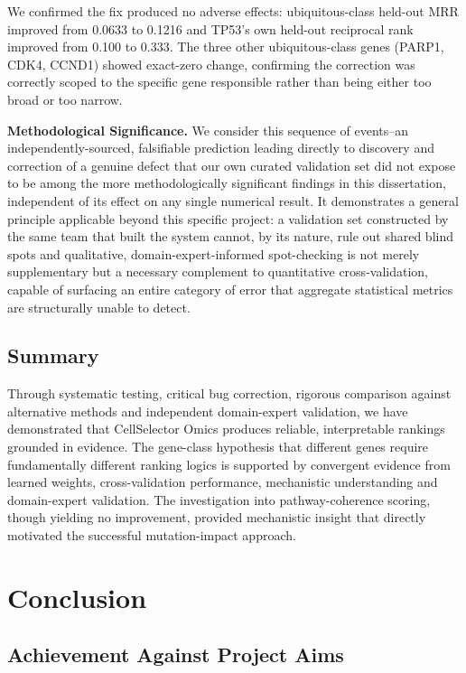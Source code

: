 \documentclass[author={Karen Coutinho, Ishaan Bhalla, Aman Raj, Dixit Kaloorani Malarmannan},
                supervisor={Dr. Daniel D'Andrea},
                degree={MSc},
                title={CellSelector Omics: A Multi-Omics Recommendation System for Cell Line Selection},
                subtitle={},
                type={},
                year={2026}]{dissertation}
\begin{document}
We confirmed the fix produced no adverse effects: ubiquitous-class held-out MRR improved from 0.0633 to 0.1216 and TP53's own held-out reciprocal rank improved from 0.100 to 0.333. The three other ubiquitous-class genes (PARP1, CDK4, CCND1) showed exact-zero change, confirming the correction was correctly scoped to the specific gene responsible rather than being either too broad or too narrow.

{\bf Methodological Significance.} We consider this sequence of events--an independently-sourced, falsifiable prediction leading directly to discovery and correction of a genuine defect that our own curated validation set did not expose to be among the more methodologically significant findings in this dissertation, independent of its effect on any single numerical result. It demonstrates a general principle applicable beyond this specific project: a validation set constructed by the same team that built the system cannot, by its nature, rule out shared blind spots and qualitative, domain-expert-informed spot-checking is not merely supplementary but a necessary complement to quantitative cross-validation, capable of surfacing an entire category of error that aggregate statistical metrics are structurally unable to detect.

\section{Summary}

Through systematic testing, critical bug correction, rigorous comparison against alternative methods and independent domain-expert validation, we have demonstrated that CellSelector Omics produces reliable, interpretable rankings grounded in evidence. The gene-class hypothesis that different genes require fundamentally different ranking logics is supported by convergent evidence from learned weights, cross-validation performance, mechanistic understanding and domain-expert validation. The investigation into pathway-coherence scoring, though yielding no improvement, provided mechanistic insight that directly motivated the successful mutation-impact approach.


\chapter{Conclusion}
\label{chap:conclusion}

\section{Achievement Against Project Aims}
\end{document}

